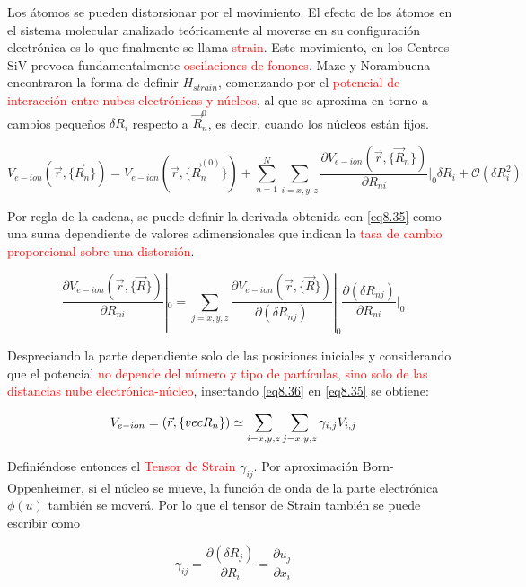 \documentclass{book}
\begin{document}
Los átomos se pueden distorsionar por el movimiento. El efecto de los átomos en el sistema molecular analizado teóricamente al moverse en su configuración electrónica es lo que finalmente se llama \textcolor{red}{strain}. Este movimiento, en los Centros SiV provoca fundamentalmente \textcolor{red}{oscilaciones de fonones}. Maze y Norambuena encontraron la forma de definir $H_{strain}$, comenzando por el \textcolor{red}{potencial de interacción entre nubes electrónicas y núcleos}, al que se aproxima en torno a cambios pequeños $\delta R_i$ respecto a  $\vec{R}_n^0$, es decir, cuando los núcleos están fijos.

\begin{equation}\label{eq8.35}V_{e-ion}(\vec{r},\{\vec{R}_n\})=V_{e-ion}(\vec{r},\{\vec{R}_n^{(0)}\})+\sum_{n=1}^N\sum_{i=x,y,z}\frac{\partial V_{e-ion}(\vec{r},\{\vec{R}_n\})}{\partial R_{ni}}|_0 \delta R_i+\mathcal{O}(\delta R_i^2)\end{equation}
 
Por regla de la cadena, se puede definir la derivada obtenida con \ref{eq8.35} como una suma dependiente de valores adimensionales que indican la \textcolor{red}{tasa de cambio proporcional sobre una distorsión}.

\begin{equation}\label{eq8.36}\frac{\partial V_{e-ion}(\vec{r},\{\vec{R}\})}{\partial R_{ni}}|_0=\sum_{j=x,y,z}\frac{\partial V_{e-ion}(\vec{r},\{\vec{R}\})}{\partial (\delta R_{nj})}|_0\frac{\partial(\delta R_{nj})}{\partial R_{ni}}|_0\end{equation}

Despreciando la parte dependiente solo de las posiciones iniciales y considerando que el potencial \textcolor{red}{no depende del número y tipo de partículas, sino solo de las distancias nube electrónica-núcleo}, insertando \ref{eq8.36} en \ref{eq8.35} se obtiene:

\begin{equation}\label{eq8.37}V_{e-ion}=(\vec{r},\{\\vec{R}_n\})\simeq \sum_{i=x,y,z}\sum_{j=x,y,z} \gamma_{i,j}V_{i,j}\end{equation}

Definiéndose entonces el \textcolor{red}{Tensor de Strain} $\gamma_{ij}$. Por aproximación Born-Oppenheimer, si el núcleo se mueve, la función de onda de la parte electrónica $\phi(u)$ también se moverá. Por lo que el tensor de Strain también se puede escribir como

\begin{equation}\label{eq8.38}\gamma_{ij}=\frac{\partial(\delta R_j)}{\partial R_i}=\frac{\partial u_j}{\partial x_i}\end{equation}
\end{document}
